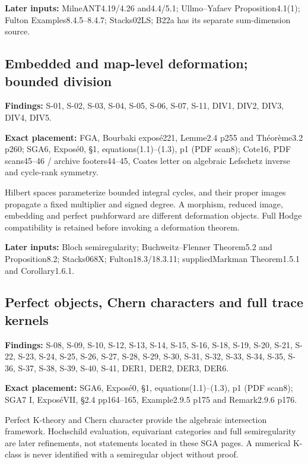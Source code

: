 \documentclass[11pt,a4paper]{article}
\theoremstyle{definition}
\begin{document}
\textbf{Later inputs:} MilneANT4.19/4.26 and4.4/5.1; Ullmo--Yafaev
Proposition4.1(1); Fulton Examples8.4.5--8.4.7; Stacks02LS; B22a has its
separate sum-dimension source.

\subsection{Embedded and map-level deformation; bounded
division}\label{FRAMEWORK-embedded-and-map-level-deformation-bounded-division}

\textbf{Findings:} S-01, S-02, S-03, S-04, S-05, S-06, S-07, S-11, DIV1,
DIV2, DIV3, DIV4, DIV5.

\textbf{Exact placement:} FGA, Bourbaki exposé221, Lemme2.4 p255 and
Théorème3.2 p260; SGA6, Exposé0, §1, equations(1.1)--(1.3), p1 (PDF
scan8); Cote16, PDF scans45--46 / archive footers44--45, Coates letter
on algebraic Lefschetz inverse and cycle-rank symmetry.

Hilbert spaces parameterize bounded integral cycles, and their proper
images propagate a fixed multiplier and signed degree. A morphism,
reduced image, embedding and perfect pushforward are different
deformation objects. Full Hodge compatibility is retained before
invoking a deformation theorem.

\textbf{Later inputs:} Bloch semiregularity; Buchweitz--Flenner
Theorem5.2 and Proposition8.2; Stacks068X; Fulton18.3/18.3.11;
suppliedMarkman Theorem1.5.1 and Corollary1.6.1.

\subsection{Perfect objects, Chern characters and full trace
kernels}\label{FRAMEWORK-perfect-objects-chern-characters-and-full-trace-kernels}

\textbf{Findings:} S-08, S-09, S-10, S-12, S-13, S-14, S-15, S-16, S-18,
S-19, S-20, S-21, S-22, S-23, S-24, S-25, S-26, S-27, S-28, S-29, S-30,
S-31, S-32, S-33, S-34, S-35, S-36, S-37, S-38, S-39, S-40, S-41, DER1,
DER2, DER3, DER6.

\textbf{Exact placement:} SGA6, Exposé0, §1, equations(1.1)--(1.3), p1
(PDF scan8); SGA7 I, ExposéVII, §2.4 pp164--165, Example2.9.5 p175 and
Remark2.9.6 p176.

Perfect K-theory and Chern character provide the algebraic intersection
framework. Hochschild evaluation, equivariant categories and full
semiregularity are later refinements, not statements located in these
SGA pages. A numerical K-class is never identified with a semiregular
object without proof.
\end{document}
